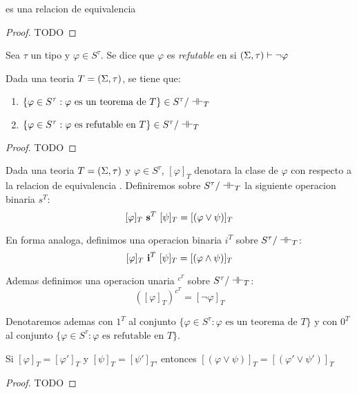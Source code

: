 \begin{lemma}
  \trel es una relacion de equivalencia
\end{lemma}
\begin{proof}
  TODO
\end{proof}

\begin{definition}
  Sea $\tau$ un tipo y $\varphi\in S^\tau$. Se dice que $\varphi$ es \emph{refutable} en \forder si $(\Sigma,\tau)\vdash\neg\varphi$
\end{definition}

\begin{lemma}
  Dada una teoria $T=(\Sigma,\tau)$, se tiene que:\begin{enumerate}
    \item $\{\varphi\in S^\tau:\varphi\text{ es un teorema de }T\}\in S^\tau/\dashv\vdash_{T}$
    \item $\{\varphi\in S^\tau:\varphi\text{ es refutable en }T\}\in S^\tau/\dashv\vdash_{T}$
  \end{enumerate}
\end{lemma}
\begin{proof}
  TODO
\end{proof}
\begin{definition}
  Dada una teoria $T=(\Sigma,\tau)$ y $\varphi\in S^\tau$, $[\varphi]_T$ denotara la clase de $\varphi$ con respecto
  a la relacion de equivalencia \trel. Definiremos sobre $S^\tau/\dashv\vdash_{T}$ la siguiente operacion binaria $s^T$:
  $$
  [\varphi]_T\ \mathbf{s}^T\ [\psi]_T = [(\varphi\lor\psi)]_T 
  $$

  En forma analoga, definimos una operacion binaria $i^T$ sobre $S^\tau/\dashv\vdash_{T}$:
  $$
  [\varphi]_T\ \mathbf{i}^T\ [\psi]_T = [(\varphi\land\psi)]_T 
  $$

  Ademas definimos una operacion unaria ${}^{c^T}$ sobre $S^\tau/\dashv\vdash_{T}$:
  $$
  ([\varphi]_T)^{c^T} = [\neg\varphi]_T
  $$

  Denotaremos ademas con $1^T$ al conjunto $\{\varphi\in S^\tau:\varphi\text{ es un teorema de }T\}$ y con
  $0^T$ al conjunto $\{\varphi\in S^\tau:\varphi\text{ es refutable en }T\}$.
\end{definition}

\begin{remark}
  Si $[\varphi]_T=[\varphi']_T$ y $[\psi]_T=[\psi']_T$, entonces $[(\varphi\lor\psi)]_T=[(\varphi'\lor\psi')]_T$
\end{remark}
\begin{proof}
  TODO
\end{proof}

